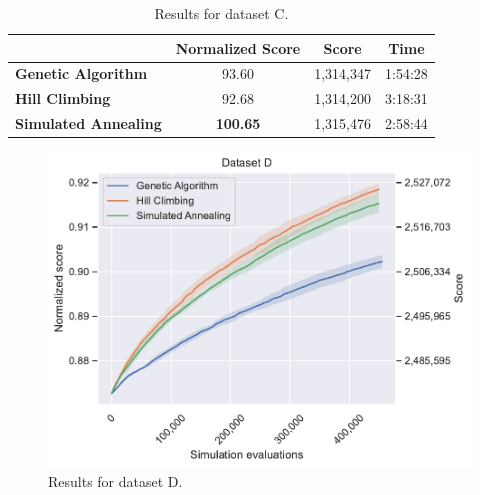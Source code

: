 \begin{table}[h]
\centering\footnotesize\sf
\begin{tabular}{lccc}
\toprule
& Normalized Score & Score & Time \\
\midrule
\textcolor{myblue}{\textbf{Genetic Algorithm}} & 93.60 & 1,314,347 & 1:54:28 \\
\textcolor{myorange}{\textbf{Hill Climbing}} & 92.68 & 1,314,200 & 3:18:31 \\
\textcolor{mygreen}{\textbf{Simulated Annealing}} & \textbf{100.65} & 1,315,476 & 2:58:44 \\
\bottomrule
\end{tabular}
\caption[Results for dataset C]{Results for dataset C.}
\label{tab:dataset_c_results}
\end{table}

\newpage

\begin{figure}
    \centering
    \includegraphics[width=\linewidth]{img/experiments/d_Genetic Algorithm_Hill Climbing_Simulated Annealing.pdf}
    \caption[Results for dataset D]{
        Results for dataset D.
    }
    \label{fig:dataset_d_experiment}
\end{figure}

